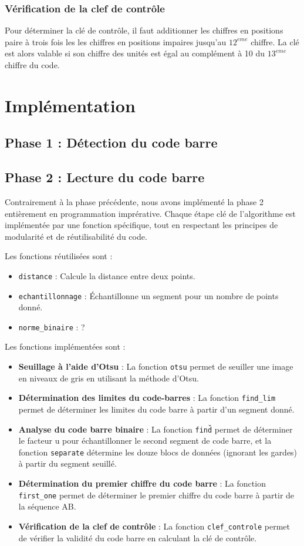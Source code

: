 \documentclass{rapport}
\begin{document}
\subsubsection*{Vérification de la clef de contrôle}
Pour déterminer la clé de contrôle, il faut additionner les chiffres en positions paire à trois fois les
les chiffres en positions impaires jusqu'au $12^{eme}$ chiffre. La clé est alors valable si son chiffre des
unités est égal au complément à 10 du $13^{eme}$ chiffre du code.
 
\section{Implémentation}

\subsection{Phase 1 : Détection du code barre}

\subsection{Phase 2 : Lecture du code barre}

Contrairement à la phase précédente, nous avons implémenté la phase 2 entièrement en programmation imprérative.
Chaque étape clé de l'algorithme est implémentée par une fonction spécifique, tout en respectant les principes de modularité et de réutilisabilité du code.

Les fonctions réutilisées sont : 
\begin{itemize}
	\item \texttt{distance} : Calcule la distance entre deux points.
	\item \texttt{echantillonnage} : Échantillonne un segment pour un nombre de points donné.
	\item \texttt{norme\_binaire} : ?
\end{itemize}

Les fonctions implémentées sont :
\begin{itemize}
	\item \textbf{Seuillage à l'aide d'Otsu} : La fonction \texttt{otsu} permet de seuiller une image en niveaux de gris en utilisant la méthode d'Otsu.
	\item \textbf{Détermination des limites du code-barres} : La fonction \texttt{find\_lim} permet de déterminer les limites du code barre à partir d'un segment donné.
	\item \textbf{Analyse du code barre binaire} : La fonction \texttt{find\u} permet de déterminer le facteur u pour échantillonner le second segment de code barre, 
	et la fonction \texttt{separate} détermine les douze blocs de données (ignorant les gardes) à partir du segment seuillé. 
	\item \textbf{Détermination du premier chiffre du code barre} : La fonction \texttt{first\_one} permet de déterminer le premier chiffre du code barre à partir de la séquence AB.
	\item \textbf{Vérification de la clef de contrôle} : La fonction \texttt{clef\_controle} permet de vérifier la validité du code barre en calculant la clé de contrôle.
\end{itemize}
\end{document}

